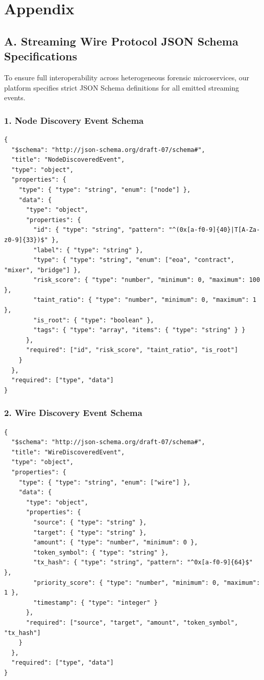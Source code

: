 \section*{Appendix}
\label{sec:appendix}

\subsection*{A. Streaming Wire Protocol JSON Schema Specifications}

To ensure full interoperability across heterogeneous forensic microservices, our platform specifies strict JSON Schema definitions for all emitted streaming events.

\subsubsection*{1. Node Discovery Event Schema}
\begin{footnotesize}
\begin{verbatim}
{
  "$schema": "http://json-schema.org/draft-07/schema#",
  "title": "NodeDiscoveredEvent",
  "type": "object",
  "properties": {
    "type": { "type": "string", "enum": ["node"] },
    "data": {
      "type": "object",
      "properties": {
        "id": { "type": "string", "pattern": "^(0x[a-f0-9]{40}|T[A-Za-z0-9]{33})$" },
        "label": { "type": "string" },
        "type": { "type": "string", "enum": ["eoa", "contract", "mixer", "bridge"] },
        "risk_score": { "type": "number", "minimum": 0, "maximum": 100 },
        "taint_ratio": { "type": "number", "minimum": 0, "maximum": 1 },
        "is_root": { "type": "boolean" },
        "tags": { "type": "array", "items": { "type": "string" } }
      },
      "required": ["id", "risk_score", "taint_ratio", "is_root"]
    }
  },
  "required": ["type", "data"]
}
\end{verbatim}
\end{footnotesize}

\subsubsection*{2. Wire Discovery Event Schema}
\begin{footnotesize}
\begin{verbatim}
{
  "$schema": "http://json-schema.org/draft-07/schema#",
  "title": "WireDiscoveredEvent",
  "type": "object",
  "properties": {
    "type": { "type": "string", "enum": ["wire"] },
    "data": {
      "type": "object",
      "properties": {
        "source": { "type": "string" },
        "target": { "type": "string" },
        "amount": { "type": "number", "minimum": 0 },
        "token_symbol": { "type": "string" },
        "tx_hash": { "type": "string", "pattern": "^0x[a-f0-9]{64}$" },
        "priority_score": { "type": "number", "minimum": 0, "maximum": 1 },
        "timestamp": { "type": "integer" }
      },
      "required": ["source", "target", "amount", "token_symbol", "tx_hash"]
    }
  },
  "required": ["type", "data"]
}
\end{verbatim}
\end{footnotesize}

